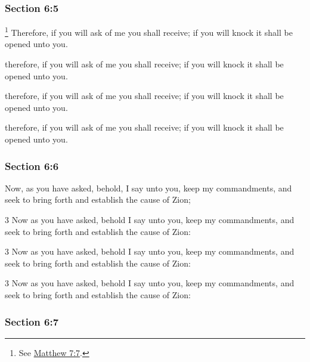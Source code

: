 	\subsubsection{Section 6:5} %
		\label{DC6-5}

			\footnote{%
				See \hyperref[MATTHEW-7-7]{Matthew 7:7}.
				}%
		Therefore, if you will ask of me you shall receive; if you will knock it shall be opened unto you.

		\begin{framed}
		\scriptsize
			\begin{compactdesc}
				\item[JSP] therefore, if you will ask of me you shall receive; if you will knock it shall be opened unto you.
				\item[DC 1835] therefore, if you will ask of me you shall receive; if you will knock it shall be opened unto you.
				\item[DC 1844] therefore, if you will ask of me you shall receive; if you will knock it shall be opened unto you.
			\end{compactdesc}
		\end{framed}

	\subsubsection{Section 6:6} %
		\label{DC6-6}

		Now, as you have asked, behold, I say unto you, keep my commandments, and seek to bring forth and establish the cause of Zion;

		\begin{framed}
		\scriptsize
			\begin{compactdesc}
				\item[JSP] 3 Now as you have asked, behold I say unto you, keep my commandments, and seek to bring forth and establish the cause of Zion:
				\item[DC 1835] 3 Now as you have asked, behold I say unto you, keep my commandments, and seek to bring forth and establish the cause of Zion: 
				\item[DC 1844] 3 Now as you have asked, behold I say unto you, keep my commandments, and seek to bring forth and establish the cause of Zion: 
			\end{compactdesc}
		\end{framed}

	\subsubsection{Section 6:7} %
		\label{DC6-7}

